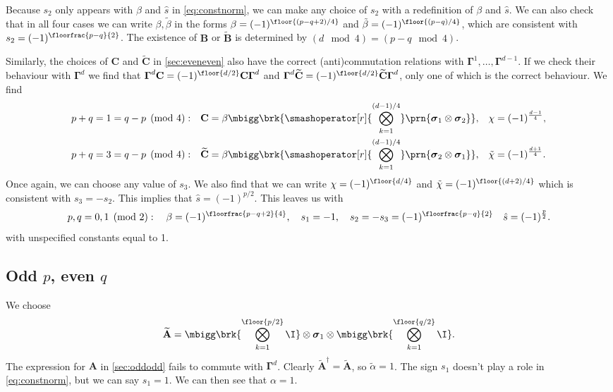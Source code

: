 \documentclass[11pt]{article}
\newcommand{\hc}{^\dag}
\newcommand{\Gammab}{\boldsymbol{\Gamma}}
\newcommand{\A}{\mathbf{A}}
\newcommand{\B}{\mathbf{B}}
\renewcommand{\C}{\mathbf{C}}
\newcommand{\At}{\widetilde{\A}}
\newcommand{\Bt}{\widetilde{\B}}
\newcommand{\Ct}{\widetilde{\C}}
\newcommand{\sigmab}{\boldsymbol{\sigma}}
\newcommand{\alphat}{\tilde{\alpha}}
\newcommand{\betat}{\tilde{\beta}}
\newcommand{\chit}{\tilde{\chi}}
\newcommand{\sh}{\hat{s}}
\begin{document}
Because \(s_2\) only appears with \(\beta\) and \(\sh\) in \cref{eq:constnorm}, we can make any choice of \(s_2\) with a redefinition of \(\beta\) and \(\sh\).
We can also check that in all four cases we can write \(\beta, \betat\) in the forms \(\beta = (-1)^{\floor{(p-q+2)/4}}\) and \(\betat = (-1)^{\floor{(p-q)/4}}\), 
which are consistent with \(s_2 = (-1)^{\floorfrac{p-q}{2}}\).
The existence of \(\B\) or \(\Bt\) is determined by \((d \mod 4) = (p-q \mod 4)\).

Similarly, the choices of \(\C\) and \(\Ct\) in \cref{sec:eveneven} also have the correct (anti)commutation relations with \(\Gammab^1, \ldots, \Gammab^{d-1}\).
If we check their behaviour with \(\Gammab^d\) we find that \(\Gammab^d \C = (-1)^{\floor{d/2}}\C \Gammab^d\) and \(\Gammab^d \Ct = (-1)^{\floor{d/2}} \Ct \Gammab^d\), only one of which is the correct behaviour.
We find
%
\begin{equation*}
\begin{aligned}
  p+q &= 1 = q-p \pmod 4: &
  \C &= \beta \mbigg\brk{\smashoperator[r]{\bigotimes_{k=1}^{(d-1)/4}}
        \prn{\sigmab_1 \otimes \sigmab_2}}, &
  \chi &= (-1)^{\frac{d-1}{4}},
  \\
  p+q &= 3 = q-p \pmod 4: &
  \Ct &= \beta \mbigg\brk{\smashoperator[r]{\bigotimes_{k=1}^{(d-1)/4}}
        \prn{\sigmab_2 \otimes \sigmab_1}}, &
  \chit &= (-1)^{\frac{d+1}{4}}.
\end{aligned}
\end{equation*}
%
Once again, we can choose any value of \(s_3\).
We also find that we can write \(\chi = (-1)^{\floor{d/4}}\) and \(\chit = (-1)^{\floor{(d+2)/4}}\) which is consistent with \(s_3 = -s_2\).
This implies that \(\sh = (-1)^{p/2}\).
This leaves us with
%
\begin{equation}\label{eq:constevenodd}
  p, q = 0,1 \pmod 2 : \quad
  \beta = (-1)^{\floorfrac{p-q+2}{4}}, \quad
  s_1 = -1, \quad
  s_2 = -s_3 = (-1)^{\floorfrac{p-q}{2}} \quad
  \sh = (-1)^{\frac{p}{2}}.
\end{equation}
%
with unspecified constants equal to 1.



\subsection{Odd \texorpdfstring{\(p\)}{p}, even \texorpdfstring{\(q\)}{q}}\label{sec:oddeven}

We choose
%
\begin{equation*}
  \At =
        \mbigg\brk{\bigotimes_{k=1}^{\floor{p/2}} \I}
        \otimes \sigmab_1
        \otimes \mbigg\brk{\bigotimes_{k=1}^{\floor{q/2}} \I}.
\end{equation*}
%
The expression for \(\A\) in \cref{sec:oddodd} fails to commute with \(\Gammab^d\).
Clearly \(\At\hc = \At\), so \(\alphat = 1\).
The sign \(s_1\) doesn't play a role in \cref{eq:constnorm}, but we can say \(s_1 = 1\).
We can then see that \(\alpha = 1\).
\end{document}
